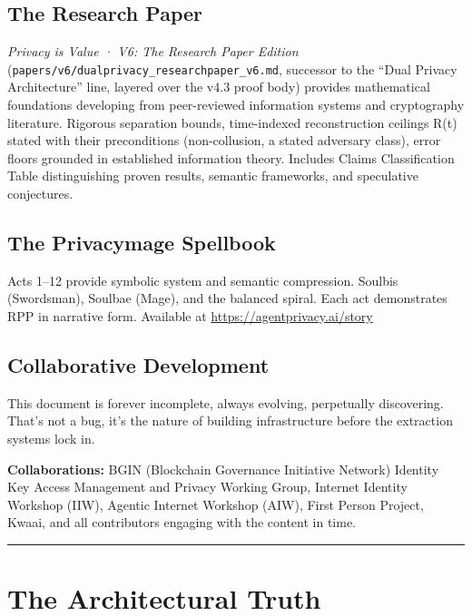 \documentclass[
  11pt,
]{article}
\begin{document}
\subsection{The Research Paper}\label{the-research-paper}

\emph{Privacy is Value · V6: The Research Paper Edition}
(\texttt{papers/v6/dualprivacy\_researchpaper\_v6.md}, successor to the
``Dual Privacy Architecture'' line, layered over the v4.3 proof body)
provides mathematical foundations developing from peer-reviewed
information systems and cryptography literature. Rigorous separation
bounds, time-indexed reconstruction ceilings R(t) stated with their
preconditions (non-collusion, a stated adversary class), error floors
grounded in established information theory. Includes Claims
Classification Table distinguishing proven results, semantic frameworks,
and speculative conjectures.

\subsection{The Privacymage Spellbook}\label{the-privacymage-spellbook}

Acts 1--12 provide symbolic system and semantic compression. Soulbis
(Swordsman), Soulbae (Mage), and the balanced spiral. Each act
demonstrates RPP in narrative form. Available at
\url{https://agentprivacy.ai/story}

\subsection{Collaborative Development}\label{collaborative-development}

This document is forever incomplete, always evolving, perpetually
discovering. That's not a bug, it's the nature of building
infrastructure before the extraction systems lock in.

\textbf{Collaborations:} BGIN (Blockchain Governance Initiative Network)
Identity Key Access Management and Privacy Working Group, Internet
Identity Workshop (IIW), Agentic Internet Workshop (AIW), First Person
Project, Kwaai, and all contributors engaging with the content in time.

\begin{center}\rule{0.5\linewidth}{0.5pt}\end{center}

\section{The Architectural Truth}\label{the-architectural-truth}
\end{document}
